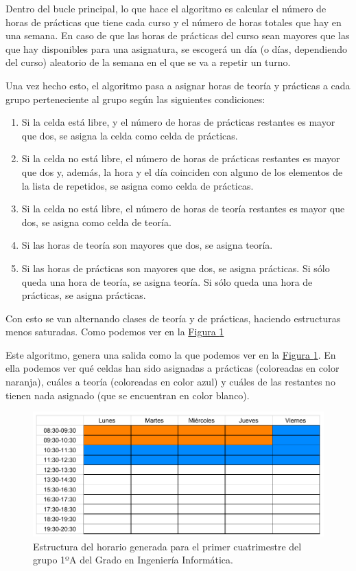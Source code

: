 Dentro del bucle principal, lo que hace el algoritmo es calcular el número de horas de prácticas que tiene cada curso y el número de horas totales que hay en una semana. En caso de que las horas de prácticas del curso sean mayores que las que hay disponibles para una asignatura, se escogerá un día (o días, dependiendo del curso) aleatorio de la semana en el que se va a repetir un turno.

Una vez hecho esto, el algoritmo pasa a asignar horas de teoría y prácticas a cada grupo perteneciente al grupo según las siguientes condiciones:

\begin{enumerate}
  \item Si la celda está libre, y el número de horas de prácticas restantes es mayor que dos, se asigna la celda como celda de prácticas.
  \item Si la celda no está libre, el número de horas de prácticas restantes es mayor que dos y, además, la hora y el día coinciden con alguno de los elementos de la lista de repetidos, se asigna como celda de prácticas.
  \item Si la celda no está libre, el número de horas de teoría restantes es mayor que dos, se asigna como celda de teoría.
  \item Si las horas de teoría son mayores que dos, se asigna teoría.
  \item Si las horas de prácticas son mayores que dos, se asigna prácticas.
  \itme Si sólo queda una hora de teoría, se asigna teoría.
  \itme Si sólo queda una hora de prácticas, se asigna prácticas.
\end{enumerate}

Con esto se van alternando clases de teoría y de prácticas, haciendo estructuras menos saturadas. Como podemos ver en la \hyperref[estructura1]{Figura \ref*{estructura1}}

Este algoritmo, genera una salida como la que podemos ver en la \hyperref[estructura1]{Figura \ref*{estructura1}}. En ella podemos ver qué celdas han sido asignadas a prácticas (coloreadas en color naranja), cuáles a teoría (coloreadas en color azul) y cuáles de las restantes no tienen nada asignado (que se encuentran en color blanco).

\begin{figure}[H]
\centering
\includegraphics[width=1\textwidth]{img/estructura1}
\caption{Estructura del horario generada para el primer cuatrimestre del grupo 1ºA del Grado en Ingeniería Informática.}
\label{estructura1}
\end{figure}

